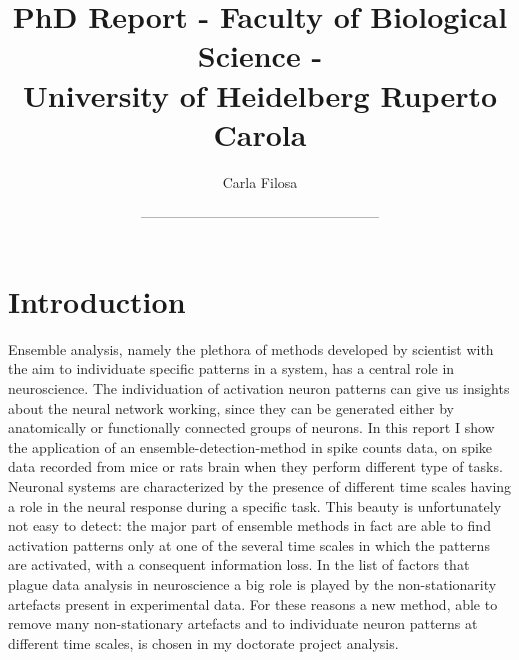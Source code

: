 \documentclass{article}
\title{PhD Report - Faculty of Biological Science -\\University of Heidelberg Ruperto Carola}
\author{Carla Filosa}
\date{---------------------------------------------------}
\begin{document}
\maketitle
\setcounter{tocdepth}{2} %

\tableofcontents %


\section{Introduction}
Ensemble analysis, namely the plethora of methods developed by scientist with the aim to individuate specific patterns in a system, has a central role in neuroscience. The individuation of activation neuron patterns can give us insights about the neural network working, since they can be generated either by anatomically or functionally connected groups of neurons.
In this report I show the application of an ensemble-detection-method in spike counts data, on spike data recorded from mice or rats brain when they perform different type of tasks. 
Neuronal systems are characterized by the presence of different time scales having a role in the neural response during a specific task. This beauty is unfortunately not easy to detect: the major part of ensemble methods in fact are able to find activation patterns only at one of the several time scales in which the patterns are activated, with a consequent information loss.
In the list of factors that plague data analysis in neuroscience a big role is played by the non-stationarity artefacts present in experimental data.
For these reasons a new method, able to remove many non-stationary artefacts and to individuate neuron patterns at different time scales, is chosen in my doctorate project analysis.
\end{document}
